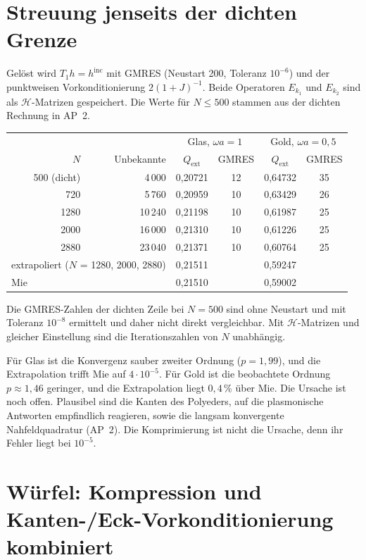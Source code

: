 \documentclass[11pt, a4paper]{article}
\begin{document}
\section{Streuung jenseits der dichten Grenze}
Gelöst wird $T_1h=h^{\mathrm{inc}}$ mit GMRES (Neustart 200, Toleranz $10^{-6}$) und der
punktweisen Vorkonditionierung $2(1+J)^{-1}$. Beide Operatoren $E_{k_1}$ und $E_{k_2}$ sind
als $\mathcal{H}$-Matrizen gespeichert. Die Werte für $N\le500$ stammen aus der dichten
Rechnung in AP~2.
\begin{center}\small
\begin{tabular}{rrcccc}
\toprule
& & \multicolumn{2}{c}{Glas, $\omega a=1$} & \multicolumn{2}{c}{Gold, $\omega a=0{,}5$}\\
$N$ & Unbekannte & $Q_{\mathrm{ext}}$ & GMRES & $Q_{\mathrm{ext}}$ & GMRES\\
\midrule
500 (dicht) & 4\,000 & 0,20721 & 12 & 0,64732 & 35\\
720 & 5\,760 & 0,20959 & 10 & 0,63429 & 26\\
1280 & 10\,240 & 0,21198 & 10 & 0,61987 & 25\\
2000 & 16\,000 & 0,21310 & 10 & 0,61226 & 25\\
2880 & 23\,040 & 0,21371 & 10 & 0,60764 & 25\\
\midrule
\multicolumn{2}{l}{extrapoliert ($N$ = 1280, 2000, 2880)} & 0,21511 & & 0,59247 & \\
\multicolumn{2}{l}{Mie} & 0,21510 & & 0,59002 & \\
\bottomrule
\end{tabular}
\end{center}
Die GMRES-Zahlen der dichten Zeile bei $N=500$ sind ohne Neustart und mit Toleranz
$10^{-8}$ ermittelt und daher nicht direkt vergleichbar. Mit $\mathcal{H}$-Matrizen und
gleicher Einstellung sind die Iterationszahlen von $N$ unabhängig.

Für Glas ist die Konvergenz sauber zweiter Ordnung ($p=1{,}99$), und die Extrapolation
trifft Mie auf $4\cdot10^{-5}$. Für Gold ist die beobachtete Ordnung $p\approx1{,}46$
geringer, und die Extrapolation liegt $0{,}4\,\%$ über Mie. Die Ursache ist noch offen.
Plausibel sind die Kanten des Polyeders, auf die plasmonische Antworten empfindlich
reagieren, sowie die langsam konvergente Nahfeldquadratur (AP~2). Die Komprimierung ist
nicht die Ursache, denn ihr Fehler liegt bei $10^{-5}$.

\section{Würfel: Kompression und Kanten-/Eck-Vorkonditionierung kombiniert}\label{sec:kombi}
\end{document}
